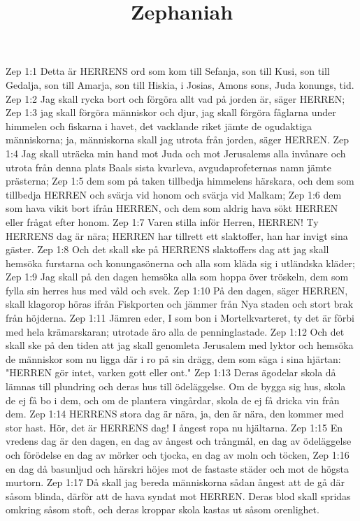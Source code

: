 

\title{Zephaniah}

Zep 1:1  Detta är HERRENS ord som kom till Sefanja, son till Kusi, son till Gedalja, son till Amarja, son till Hiskia, i Josias, Amons sons, Juda konungs, tid.
Zep 1:2  Jag skall rycka bort och förgöra allt vad på jorden är, säger HERREN;
Zep 1:3  jag skall förgöra människor och djur, jag skall förgöra fåglarna under himmelen och fiskarna i havet, det vacklande riket jämte de ogudaktiga människorna; ja, människorna skall jag utrota från jorden, säger HERREN.
Zep 1:4  Jag skall uträcka min hand mot Juda och mot Jerusalems alla invånare och utrota från denna plats Baals sista kvarleva, avgudaprofeternas namn jämte prästerna;
Zep 1:5  dem som på taken tillbedja himmelens härskara, och dem som tillbedja HERREN och svärja vid honom och svärja vid Malkam;
Zep 1:6  dem som hava vikit bort ifrån HERREN, och dem som aldrig hava sökt HERREN eller frågat efter honom.
Zep 1:7  Varen stilla inför Herren, HERREN! Ty HERRENS dag är nära; HERREN har tillrett ett slaktoffer, han har invigt sina gäster.
Zep 1:8  Och det skall ske på HERRENS slaktoffers dag att jag skall hemsöka furstarna och konungasönerna och alla som kläda sig i utländska kläder;
Zep 1:9  Jag skall på den dagen hemsöka alla som hoppa över tröskeln, dem som fylla sin herres hus med våld och svek.
Zep 1:10  På den dagen, säger HERREN, skall klagorop höras ifrån Fiskporten och jämmer från Nya staden och stort brak från höjderna.
Zep 1:11  Jämren eder, I som bon i Mortelkvarteret, ty det är förbi med hela krämarskaran; utrotade äro alla de penninglastade.
Zep 1:12  Och det skall ske på den tiden att jag skall genomleta Jerusalem med lyktor och hemsöka de människor som nu ligga där i ro på sin drägg, dem som säga i sina hjärtan: "HERREN gör intet, varken gott eller ont."
Zep 1:13  Deras ägodelar skola då lämnas till plundring och deras hus till ödeläggelse. Om de bygga sig hus, skola de ej få bo i dem, och om de plantera vingårdar, skola de ej få dricka vin från dem.
Zep 1:14  HERRENS stora dag är nära, ja, den är nära, den kommer med stor hast. Hör, det är HERRENS dag! I ångest ropa nu hjältarna.
Zep 1:15  En vredens dag är den dagen, en dag av ångest och trångmål, en dag av ödeläggelse och förödelse en dag av mörker och tjocka, en dag av moln och töcken,
Zep 1:16  en dag då basunljud och härskri höjes mot de fastaste städer och mot de högsta murtorn.
Zep 1:17  Då skall jag bereda människorna sådan ångest att de gå där såsom blinda, därför att de hava syndat mot HERREN. Deras blod skall spridas omkring såsom stoft, och deras kroppar skola kastas ut såsom orenlighet.
